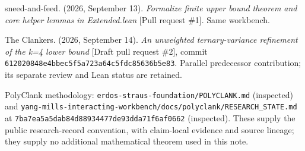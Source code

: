 sneed-and-feed. (2026, September 13). \emph{Formalize finite upper bound theorem and core helper lemmas in Extended.lean} {[}Pull request \#1{]}. Same workbench.

The Clankers. (2026, September 14). \emph{An unweighted ternary-variance refinement of the k=4 lower bound} {[}Draft pull request \#2{]}, commit \nolinkurl{612020848e4bbec5f5a723a64c5fdc85636b5e83}. Parallel predecessor contribution; its separate review and Lean status are retained.

PolyClank methodology: \nolinkurl{erdos-straus-foundation/POLYCLANK.md} (inspected) and \nolinkurl{yang-mills-interacting-workbench/docs/polyclank/RESEARCH_STATE.md} at \nolinkurl{7ba7ea5a5dab84d88934477de93dda71f6af0662} (inspected). These supply the public research-record convention, with claim-local evidence and source lineage; they supply no additional mathematical theorem used in this note.
